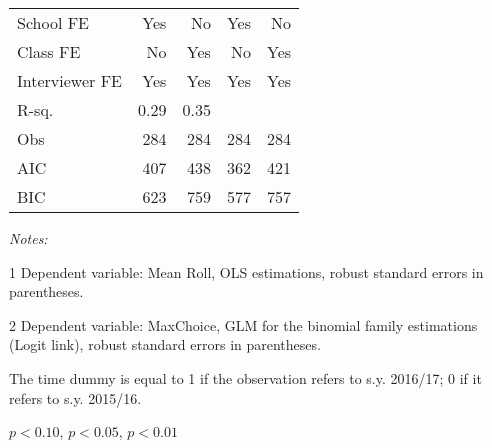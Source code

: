\begin{table}[htbp]
\begin{threeparttable}
\begin{tabular}{l*{4}{D{.}{.}{-1}}}
School FE           &                 Yes   &                  No   &                 Yes   &                  No   \\
Class FE            &                  No   &                 Yes   &                  No   &                 Yes   \\
Interviewer FE      &                 Yes   &                 Yes   &                 Yes   &                 Yes   \\
\midrule
R-sq.               &                0.29   &                0.35   &                       &                       \\
Obs                 &                 284   &                 284   &                 284   &                 284   \\
AIC                 &                 407   &                 438   &                 362   &                 421   \\
BIC                 &                 623   &                 759   &                 577   &                 757   \\
\bottomrule
\end{tabular}
\begin{tablenotes}
\footnotesize
\flushleft \textit{Notes:} 
\item[1] Dependent variable: Mean Roll, OLS estimations, robust standard errors in parentheses.
\item[2] Dependent variable: MaxChoice, GLM for the binomial family estimations (Logit link), robust standard errors in parentheses.
\item The time dummy is equal to 1 if the observation refers to s.y. 2016/17; 0 if it refers to s.y. 2015/16.
\item \sym{*} \(p<0.10\), \sym{**} \(p<0.05\), \sym{***} \(p<0.01\)
\end{tablenotes}
\end{threeparttable}
\label{tab:stability}
\end{table}
